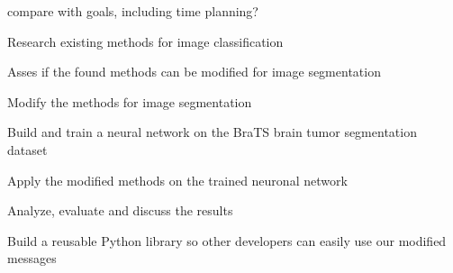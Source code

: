 compare with goals, including time planning?

\item Research existing methods for image classification
\item Asses if the found methods can be modified for image segmentation
\item Modify the methods for image segmentation
\item Build and train a neural network on the BraTS brain tumor segmentation dataset
\item Apply the modified methods on the trained neuronal network
\item Analyze, evaluate and discuss the results
\item Build a reusable Python library so other developers can easily use our modified messages
